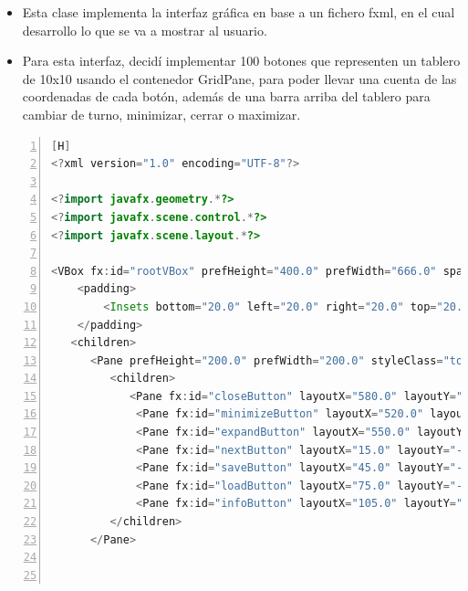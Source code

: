 \documentclass{article}
\begin{document}
	\begin{itemize}	
		\item Esta clase implementa la interfaz gráfica en base a un fichero fxml, en el cual desarrollo lo que se va a mostrar al usuario.
		\item Para esta interfaz, decidí implementar 100 botones que representen un tablero de 10x10 usando el contenedor GridPane, para poder llevar una cuenta de las coordenadas de cada botón, además de una barra arriba del tablero para cambiar de turno, minimizar, cerrar o maximizar.
	\end{itemize}
	\begin{lstlisting}[language=java,caption={Archivo FXML}, numbers=left][H]
<?xml version="1.0" encoding="UTF-8"?>

<?import javafx.geometry.*?>
<?import javafx.scene.control.*?>
<?import javafx.scene.layout.*?>

<VBox fx:id="rootVBox" prefHeight="400.0" prefWidth="666.0" spacing="20.0" styleClass="vbox" stylesheets="@css/game.css" xmlns="http://javafx.com/javafx/17.0.2-ea" xmlns:fx="http://javafx.com/fxml/1" fx:controller="com.example.lab22.VideoGameController">
    <padding>
        <Insets bottom="20.0" left="20.0" right="20.0" top="20.0" />
    </padding>
   <children>
      <Pane prefHeight="200.0" prefWidth="200.0" styleClass="toolBar">
         <children>
            <Pane fx:id="closeButton" layoutX="580.0" layoutY="-12.0" onMouseClicked="#handleCloseButton" />
             <Pane fx:id="minimizeButton" layoutX="520.0" layoutY="-12.0" onMouseClicked="#handleMinimizeButton" />
             <Pane fx:id="expandButton" layoutX="550.0" layoutY="-12.0" onMouseClicked="#handleExpandButton" />
             <Pane fx:id="nextButton" layoutX="15.0" layoutY="-12.0" onMouseClicked="#changeTurn" />
             <Pane fx:id="saveButton" layoutX="45.0" layoutY="-12.0" onMouseClicked="#saveGame" />
             <Pane fx:id="loadButton" layoutX="75.0" layoutY="-12.0" onMouseClicked="#loadGame" />
             <Pane fx:id="infoButton" layoutX="105.0" layoutY="-12.0" onMouseClicked="#showRulesDialog" />
         </children>
      </Pane>
       


\end{lstlisting}
\end{document}
